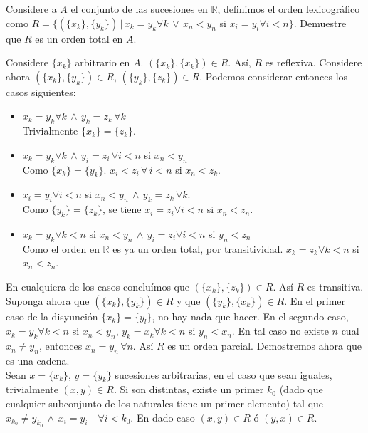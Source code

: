\begin{problem}
    Considere a $A$ el conjunto de las sucesiones en $\mathbb{R}$, definimos el
    orden lexicográfico como $R=\{(\{x_k\},\{y_k\}) \, | \, x_k = y_k
    \forall k \, \lor \, x_n < y_n$ si $x_i = y_i \forall i < n  \}$.
    Demuestre que $R$ es un orden total en $A$.
\end{problem}
\begin{sol}
    Considere $\{x_k\}$ arbitrario en $A$. $(\{x_k\},\{x_k\})\in R$. Así,
    $R$ es reflexiva. Considere ahora $(\{x_k\},\{y_k\})\in
    R$, $(\{y_k\},\{z_k\})\in R$.
    Podemos considerar entonces los casos siguientes:
    \begin{itemize}
        \item  $x_k = y_k\forall k \, \land \, y_k = z_k \, \forall k$ \\
            Trivialmente $\{x_k\}=\{z_k\}$.
        \item  $x_k = y_k\forall k \, \land \, y_i 
            = z_i \, \forall i < n $ si $x_n<y_n$\\
            Como $\{x_k\}=\{y_k\}$. $x_i < z_i \, \forall \, i < n$ si
            $x_n<z_k$.
        \item $x_i = y_i \forall i<n$ si $x_n < y_n \, \land \, y_k = z_k \,
            \forall k$. \\
            Como $\{y_k\} = \{z_k\}$, se tiene $x_i = z_i \forall i<n$ si
            $x_n < z_n$.
        \item $x_k = y_k \forall k<n$ si $x_n < y_n \, \land \, y_i = z_i
            \forall i<n$ si $y_n < z_n$ \\
            Como el orden en $\mathbb{R}$ es ya un orden total, por
            transitividad. $x_k=z_k \forall k<n$ si $x_n<z_n$.
    \end{itemize}
    En cualquiera de los casos concluímos que $(\{x_k\},\{z_k\})\in R$. Así
    $R$ es transitiva.
    Suponga ahora que $(\{x_k\},\{y_k\}) \in R$ y que $(\{y_k\},\{x_k\}) \in
    R$. 
    En el primer caso de la disyunción $\{x_k\} = \{y_l\}$, no hay nada que
    hacer. En el segundo caso, $x_k=y_k \forall k<n$ si $x_n<y_n$, 
    $y_k=x_k \forall k<n$ si $y_n<x_n$. En tal caso no existe $n$ cual $x_n
    \neq y_n$, entonces $x_n =y_n \, \forall n $. Así $R$ es un orden parcial.
    Demostremos ahora que es una cadena. \\
    Sean $x=\{x_k\}$, $y=\{y_k\}$ sucesiones arbitrarias, en el caso que sean
    iguales, trivialmente $(x,y)\in R$. Si son distintas, existe un primer
    $k_0$ (dado que cualquier subconjunto de los naturales tiene un primer
    elemento) tal que $x_{k_0}\neq y_{k_0} \, \land \, x_i = y_i \quad
    \forall i < k_0$. En dado caso $(x,y)\in R$ ó $(y,x)\in R$.


\end{sol}

